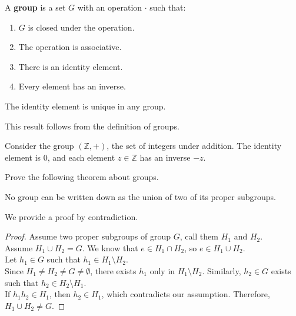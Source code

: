 \documentclass[english]{KNED}
\begin{document}
\begin{definition}
A \textbf{group} is a set $G$ with an operation $\cdot$ such that:
\begin{enumerate}
    \item $G$ is closed under the operation.
    \item The operation is associative.
    \item There is an identity element.
    \item Every element has an inverse.
\end{enumerate}
\end{definition}

\begin{corollary}
The identity element is unique in any group.
\end{corollary}

\begin{remark}
This result follows from the definition of groups.
\end{remark}

\begin{example}
Consider the group $(\mathbb{Z}, +)$, the set of integers under addition. The identity element is $0$, and each element $z \in \mathbb{Z}$ has an inverse $-z$.
\end{example}


\begin{exercise}
Prove the following theorem about groups.
\begin{theorem}
No group can be written down as the union of two of its proper subgroups.
\end{theorem}

\end{exercise}

\begin{solution}
We provide a proof by contradiction.

\begin{proof}
Assume two proper subgroups of group $G$, call them $H_1$ and $H_2$.\\ 
Assume $H_1 \cup H_2 = G$. We know that $e \in H_1 \cap H_2$, so $e \in H_1 \cup H_2$.\\
Let $h_1 \in G$ such that $h_1 \in H_1 \setminus H_2$.\\
Since $H_1 \neq H_2 \neq G \neq \emptyset$, there exists $h_1$ only in $H_1 \setminus H_2$. Similarly, $h_2 \in G$ exists such that $h_2 \in H_2 \setminus H_1$.\\
If $h_1h_2 \in H_1$, then $h_2 \in H_1$, which contradicts our assumption. Therefore, $H_1 \cup H_2 \neq G$.
\end{proof}

\end{solution}
\end{document}

